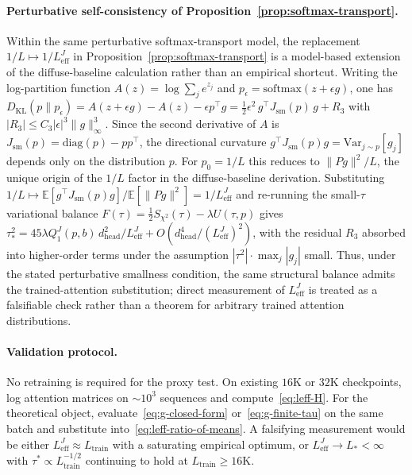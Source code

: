 \paragraph{Perturbative self-consistency of Proposition~\ref{prop:softmax-transport}.} Within the same perturbative softmax-transport model, the replacement $1/L \mapsto 1/L_{\mathrm{eff}}^{J}$ in Proposition~\ref{prop:softmax-transport} is a model-based extension of the diffuse-baseline calculation rather than an empirical shortcut. Writing the log-partition function $A(z) = \log\sum_j e^{z_j}$ and $p_\epsilon = \mathrm{softmax}(z+\epsilon g)$, one has $D_{\mathrm{KL}}(p\|p_\epsilon) = A(z+\epsilon g) - A(z) - \epsilon p^\top g = \tfrac{1}{2}\epsilon^2\, g^\top J_{\mathrm{sm}}(p)\,g + R_3$ with $|R_3|\le C_3|\epsilon|^3\|g\|_\infty^3$. Since the second derivative of $A$ is $J_{\mathrm{sm}}(p) = \mathrm{diag}(p) - pp^\top$, the directional curvature $g^\top J_{\mathrm{sm}}(p)g = \mathrm{Var}_{j\sim p}[g_j]$ depends only on the distribution $p$. For $p_0 = 1/L$ this reduces to $\|Pg\|^2/L$, the unique origin of the $1/L$ factor in the diffuse-baseline derivation. Substituting $1/L \mapsto \mathbb{E}[g^\top J_{\mathrm{sm}}(p) g]/\mathbb{E}[\|Pg\|^2] = 1/L_{\mathrm{eff}}^{J}$ and re-running the small-$\tau$ variational balance $F(\tau) = \tfrac{1}{2}S_{\chi^2}(\tau) - \lambda U(\tau,p)$ gives $\tau_*^2 = 45\lambda Q_1^{J}(p,b)\,d_{\mathrm{head}}^2/L_{\mathrm{eff}}^{J} + O(d_{\mathrm{head}}^4/(L_{\mathrm{eff}}^{J})^2)$, with the residual $R_3$ absorbed into higher-order terms under the assumption $|\tau^2|\cdot\max_j|g_j|$ small. Thus, under the stated perturbative smallness condition, the same structural balance admits the trained-attention substitution; direct measurement of $L_{\mathrm{eff}}^{J}$ is treated as a falsifiable check rather than a theorem for arbitrary trained attention distributions.

\paragraph{Validation protocol.}
No retraining is required for the proxy test. On existing $16$K or $32$K checkpoints, log attention matrices on ${\sim}10^3$ sequences and compute~\eqref{eq:leff-H}. For the theoretical object, evaluate~\eqref{eq:g-closed-form} or~\eqref{eq:g-finite-tau} on the same batch and substitute into~\eqref{eq:leff-ratio-of-means}. A falsifying measurement would be either $L_{\mathrm{eff}}^{J}{\approx}L_{\mathrm{train}}$ with a saturating empirical optimum, or $L_{\mathrm{eff}}^{J}\!\to\!L_*{<}\infty$ with $\tau^{*}\!\propto\!L_{\mathrm{train}}^{-1/2}$ continuing to hold at $L_{\mathrm{train}}{\geq}16$K.

